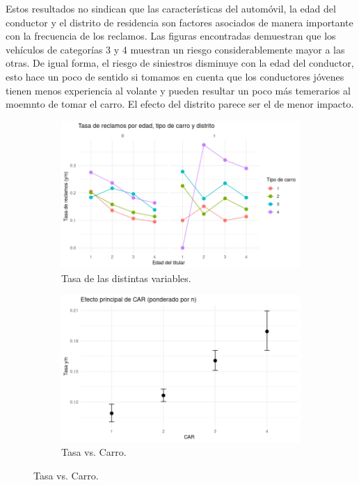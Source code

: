 Estos resultados no sindican que las características del automóvil, la edad del conductor y el distrito
de residencia son factores asociados de manera importante con la frecuencia de los reclamos. Las figuras
encontradas demuestran que los vehículos de categorías 3 y 4 muestran un riesgo considerablemente mayor 
a las otras. De igual forma, el riesgo de siniestros disminuye con la edad del conductor, esto hace un 
poco de sentido si tomamos en cuenta que los conductores jóvenes tienen menos experiencia al volante 
y pueden resultar un poco más temerarios al moemnto de tomar el carro. El efecto del distrito parece 
ser el de menor impacto. 

\begin{figure}[h!]
    \centering
    
    \begin{subfigure}[b]{0.48\textwidth}
        \centering
        \includegraphics[width=\textwidth]{Images/tasa-reclamos-edad-titular.png}
        \caption{Tasa de las distintas variables.}
        \label{fig:img1}
    \end{subfigure}
    \hfill %
    \begin{subfigure}[b]{0.48\textwidth}
        \centering
        \includegraphics[width=\textwidth]{Images/CAR-seguros.png}
        \caption{Tasa vs. Carro.}
        \label{fig:img2}
    \end{subfigure}
    

\end{figure}

